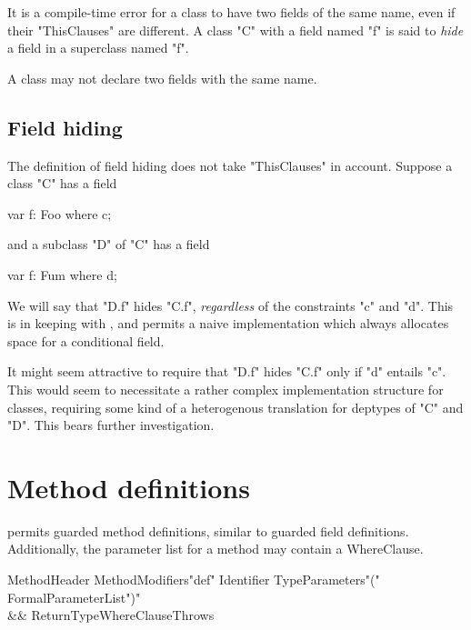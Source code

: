 It is a compile-time error for a class to have two fields of the same
name, even if their \xcd"ThisClauses" are different. A class \xcd"C" with a field
named \xcd"f" is said to {\em hide} a field in a superclass named \xcd"f".

\begin{staticrule*}
     A class may not declare two fields with the same name.
\end{staticrule*}

\subsection{Field hiding}

The definition of field hiding does not take \xcd"ThisClauses" in
account. Suppose a class \xcd"C" has a field

\begin{xten}
var f: Foo where c;
\end{xten}
\noindent and a subclass \xcd"D" of \xcd"C" has a field
\begin{xten}
var f: Fum where d;
\end{xten}

We will say that \xcd"D.f" hides \xcd"C.f", {\em regardless} of the
constraints \xcd"c" and \xcd"d". This is in keeping with \Java, and
permits a naive implementation which always allocates space for a
conditional field.

\begin{rationale}
It might seem attractive to require that \xcd"D.f"
hides \xcd"C.f" only if \xcd"d" entails \xcd"c". This would seem
to necessitate a rather complex implementation structure for classes,
requiring some kind of a heterogenous translation for deptypes of \xcd"C"
and \xcd"D". This bears further investigation.
\end{rationale}

\section{Method definitions}

\Xten{} permits guarded method definitions, similar to guarded
field definitions. Additionally, the parameter list for a method may
contain a WhereClause.

\begin{grammar}
MethodHeader \:  
  MethodModifiers\opt \xcd"def" Identifier TypeParameters\opt \xcd"("
  FormalParameterList\opt \xcd")" \\
  && ReturnType\opt WhereClause\opt Throws\opt
\end{grammar}

